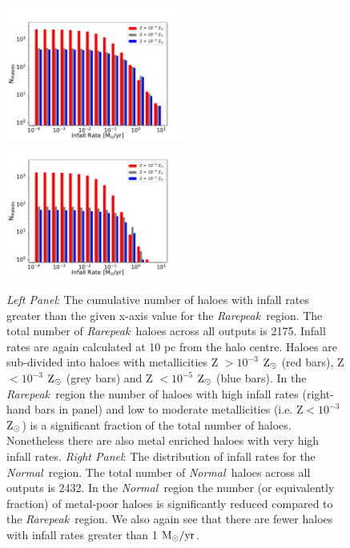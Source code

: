 \documentclass[graphics, twocolumn, usenatbib]{mn2e}
\newcommand{\msolaryrc} {$\rm{M_{\odot}/yr}$}
\newcommand{\zsolar} {$\rm{Z_{\odot}}~$}
\newcommand{\zsolarc} {$\rm{Z_{\odot}}$}
\newcommand{\rarepeak} {\textit{Rarepeak~}}
\newcommand{\normal} {\textit{Normal~}}
\begin{document}
\begin{figure}
\centering
\begin{minipage}{175mm}      \begin{center} 
\centerline{
\includegraphics[width=0.525\textwidth]{FIGURES/Rarepeak_NHaloes.pdf}
\includegraphics[width=0.525\textwidth]{FIGURES/Normal_NHaloes.pdf}}
\caption{\textit{Left Panel}: The cumulative number of haloes with infall rates greater than the given
  x-axis value for the \rarepeak region.  The total number of \rarepeak haloes across all outputs
  is 2175. Infall rates are again calculated at 10 pc from the halo centre.
  Haloes are sub-divided into haloes with metallicities Z $> 10^{-3}$ \zsolar (red bars),
  Z $< 10^{-3}$ \zsolar (grey bars) and  Z $< 10^{-5}$ \zsolar (blue bars). In the \rarepeak region
  the number of haloes with high infall rates (right-hand bars in panel) and low to moderate metallicities
  (i.e. Z$ < 10^{-3}$ \zsolarc) is a significant fraction of the total number of haloes. Nonetheless there
  are also metal enriched haloes with very high infall rates. \textit{Right Panel}: The distribution of
  infall rates for the \normal region. The  total number of \normal haloes across all outputs is 2432.
  In the \normal region the number (or equivalently fraction) of metal-poor haloes is significantly reduced
  compared to the \rarepeak region. We also again see that there are fewer haloes with infall rates greater
  than 1 \msolaryrc. } \label{Fig:Histogram}
\end{center} \end{minipage}

\end{figure}
\end{document}
